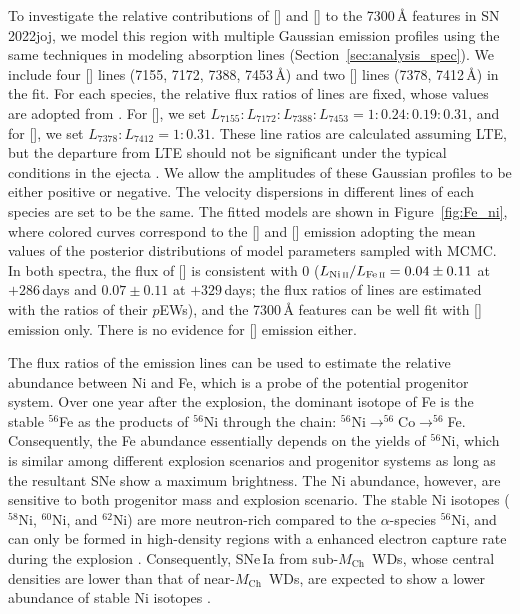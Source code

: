 \documentclass[twocolumn]{aastex631}
\newcommand{\sn}{SN\,2022joj}
\newcommand{\Mch}{$M_\mathrm{Ch}$}
\begin{document}
\begin{CJK*}{UTF8}{gbsn}
To investigate the relative contributions of [] and [] to the 7300\,\r{A} features in \sn, we model this region with multiple Gaussian emission profiles using the same techniques in modeling absorption lines (Section~\ref{sec:analysis_spec}). We include four [] lines (7155, 7172, 7388, 7453\,\r{A}) and two [] lines (7378, 7412\,\r{A}) in the fit. For each species, the relative flux ratios of lines are fixed, whose values are adopted from \citet{Jerkstrand_2015}. For [], we set $L_{7155}:L_{7172}:L_{7388}:L_{7453} = 1:0.24:0.19:0.31$, and for [], we set $L_{7378}:L_{7412} = 1:0.31$. These line ratios are calculated assuming LTE, but the departure from LTE should not be significant under the typical conditions in the ejecta \citep{Jerkstrand_2015}. We allow the amplitudes of these Gaussian profiles to be either positive or negative. The velocity dispersions in different lines of each species are set to be the same. The fitted models are shown in Figure~\ref{fig:Fe_ni}, where colored curves correspond to the [] and [] emission adopting the mean values of the posterior distributions of model parameters sampled with MCMC. In both spectra, the flux of [] is consistent with 0 (${L_{\mathrm{Ni}\,\textsc{ii}}}/{L_{\mathrm{Fe}\,\textsc{ii}}}=0.04\pm0.11$ at $+286$\,days and $0.07\pm0.11$ at $+329$\,days; the flux ratios of lines are estimated with the ratios of their $p$EWs), and the 7300\,\r{A} features can be well fit with [] emission only. There is no evidence for [] emission either.

The flux ratios of the emission lines can be used to estimate the relative abundance between Ni and Fe, which is a probe of the potential progenitor system. Over one year after the explosion, the dominant isotope of Fe is the stable $^{56}$Fe as the products of $^{56}$Ni through the chain: $^{56}$Ni$\rightarrow^{56}$Co$\rightarrow^{56}$Fe. Consequently, the Fe abundance essentially depends on the yields of $^{56}$Ni, which is similar among different explosion scenarios and progenitor systems as long as the resultant SNe show a maximum brightness. The Ni abundance, however, are sensitive to both progenitor mass and explosion scenario. The stable Ni isotopes ($^{58}$Ni, $^{60}$Ni, and $^{62}$Ni) are more neutron-rich compared to the $\alpha$-species $^{56}$Ni, and can only be formed in high-density regions with a enhanced electron capture rate during the explosion \citep{Nomoto_1984,Khokhlov_1991}. Consequently, SNe\,Ia from sub-\Mch\ WDs, whose central densities are lower than that of near-\Mch\ WDs, are expected to show a lower abundance of stable Ni isotopes \citep{Iwamoto_1999,Seitenzahl_2013,Shen_DD_2018}. 


\end{CJK*}
\end{document}
